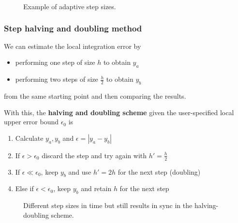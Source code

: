\begin{figure}[!htb]
  \centering
  \hfill
  \caption{Example of adaptive step sizes.}
  \label{fig:adaptive_example}
\end{figure}

\subsubsection{Step halving and doubling method}
We can estimate the local integration error by
\begin{itemize}
  \item performing one step of size $h$ to obtain $y_a$
  \item performing two steps of size $\frac{h}{2}$ to obtain $y_b$
\end{itemize}
from the same starting point and then comparing the results.

With this, the \textbf{halving and doubling scheme} given the user-specified local upper error bound $\epsilon_0$ is
\begin{enumerate}
  \item Calculate $y_a,y_b$ and $\epsilon = |y_a - y_b|$
  \item If $\epsilon > \epsilon_0$ discard the step and try again with $h' = \frac{h}{2}$
  \item If $\epsilon \ll \epsilon_0$, keep $y_b$ and use $h' = 2h$ for the next step (doubling)
  \item Else if $\epsilon < \epsilon_0$, keep $y_b$ and retain $h$ for the next step
\end{enumerate}


\begin{figure}[!htb]
  \centering
  \hfill
  \caption{Different step sizes in time but still results in sync in the halving-doubling scheme.}
  \label{fig:halving_doubling_grid}
\end{figure}


